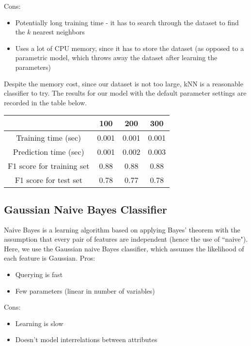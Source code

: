 \documentclass[12 pt]{article}
\numberwithin{equation}{section}
\begin{document}
Cons:
\begin{itemize}
	\item Potentially long training time - it has to search through the dataset to find the $k$ nearest neighbors
	\item Uses a lot of CPU memory, since it has to store the dataset (as opposed to a parametric model, which throws away the dataset after learning the parameters)
\end{itemize}

Despite the memory cost, since our dataset is not too large, kNN is a reasonable classifier to try. The results for our model with the default parameter settings are recorded in the table below.

\begin{center}
  \begin{tabular}{| c | c | c | c | }
    \hline
    & 100 & 200 & 300 \\ \hline
    Training time (sec) & 0.001 & 0.001 & 0.001 \\ \hline
    Prediction time (sec) & 0.001 & 0.002 & 0.003 \\ \hline 
    F1 score for training set & 0.88  & 0.88 & 0.88 \\ \hline
    F1 score for test set & 0.78 & 0.77 & 0.78 \\ \hline
  \end{tabular}
\end{center}

\subsection{Gaussian Naive Bayes Classifier}
Naive Bayes is a learning algorithm based on applying Bayes' theorem with the assumption that every pair of features are independent (hence the use of ``naive"). Here, we use the Gaussian naive Bayes classifier, which assumes the likelihood of each feature is Gaussian.
Pros:
\begin{itemize}
	\item Querying is fast
	\item Few parameters (linear in number of variables)
\end{itemize}

Cons:
\begin{itemize}
	\item Learning is slow
	\item Doesn't model interrelations between attributes
\end{itemize}
\end{document}
